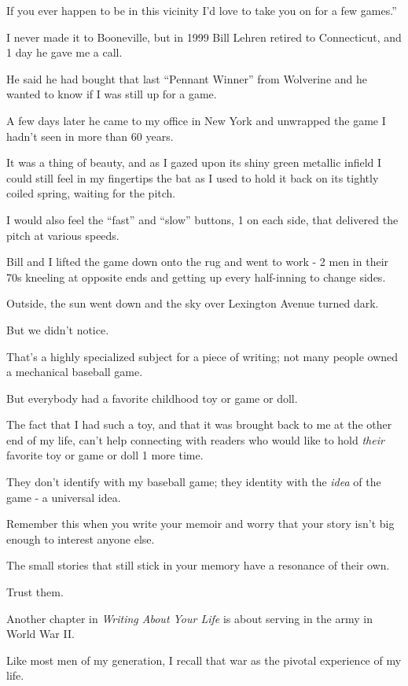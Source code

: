 \documentclass{book}
\numberwithin{equation}{section}
\begin{document}
If you ever happen to be in this vicinity I'd love to take you on for a few games.''

%
I never made it to Booneville, but in 1999 Bill Lehren retired to Connecticut, and 1 day he gave me a call.

He said he had bought that last ``Pennant Winner'' from Wolverine and he wanted to know if I was still up for a game.

A few days later he came to my office in New York and unwrapped the game I hadn't seen in more than 60 years.

%
It was a thing of beauty, and as I gazed upon its shiny green metallic infield I could still feel in my fingertips the bat as I used to hold it back on its tightly coiled spring, waiting for the pitch.

I would also feel the ``fast'' and ``slow'' buttons, 1 on each side, that delivered the pitch at various speeds.

Bill and I lifted the game down onto the rug and went to work - 2 men in their 70s kneeling at opposite ends and getting up every half-inning to change sides.

Outside, the sun went down and the sky over Lexington Avenue turned dark.

But we didn't notice.

%
That's a highly specialized subject for a piece of writing; not many people owned a mechanical baseball game.

But everybody had a favorite childhood toy or game or doll.

The fact that I had such a toy, and that it was brought back to me at the other end of my life, can't help connecting with readers who would like to hold \textit{their} favorite toy or game or doll 1 more time.

They don't identify with my baseball game; they identity with the \textit{idea} of the game - a universal idea.

%
Remember this when you write your memoir and worry that your story isn't big enough to interest anyone else.

The small stories that still stick in your memory have a resonance of their own.

Trust them.

%
Another chapter in \textit{Writing About Your Life} is about serving in the army in World War II.

Like most men of my generation, I recall that war as the pivotal experience of my life.
\end{document}
